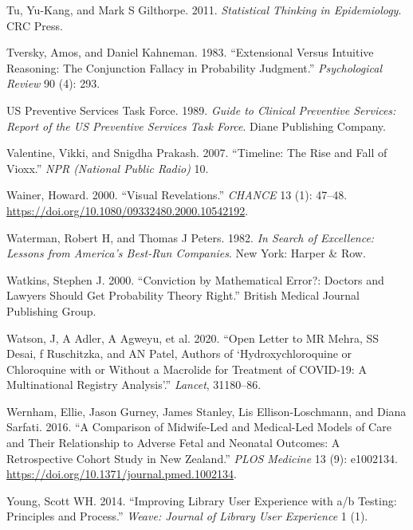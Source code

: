 \documentclass[
  10ptls,
  b5paper]{book}
\newlength{\cslhangindent}
\newlength{\cslentryspacingunit} %
\newenvironment{CSLReferences}[2] %
 {%
  \setlength{\parindent}{0pt}
  \ifodd #1
  \let\oldpar\par
  \def\par{\hangindent=\cslhangindent\oldpar}
  \fi
  \setlength{\parskip}{#2\cslentryspacingunit}
 }%
 {}
\begin{document}
\begin{CSLReferences}{1}{0}
\leavevmode{}%
Tu, Yu-Kang, and Mark S Gilthorpe. 2011. \emph{Statistical Thinking in Epidemiology}. CRC Press.

\leavevmode{}%
Tversky, Amos, and Daniel Kahneman. 1983. {``Extensional Versus Intuitive Reasoning: The Conjunction Fallacy in Probability Judgment.''} \emph{Psychological Review} 90 (4): 293.

\leavevmode{}%
US Preventive Services Task Force. 1989. \emph{Guide to Clinical Preventive Services: Report of the US Preventive Services Task Force}. Diane Publishing Company.

\leavevmode{}%
Valentine, Vikki, and Snigdha Prakash. 2007. {``Timeline: The Rise and Fall of Vioxx.''} \emph{NPR (National Public Radio)} 10.

\leavevmode{}%
Wainer, Howard. 2000. {``Visual Revelations.''} \emph{CHANCE} 13 (1): 47--48. \url{https://doi.org/10.1080/09332480.2000.10542192}.

\leavevmode{}%
Waterman, Robert H, and Thomas J Peters. 1982. \emph{In Search of Excellence: Lessons from America's Best-Run Companies}. New York: Harper \& Row.

\leavevmode{}%
Watkins, Stephen J. 2000. {``Conviction by Mathematical Error?: Doctors and Lawyers Should Get Probability Theory Right.''} British Medical Journal Publishing Group.

\leavevmode{}%
Watson, J, A Adler, A Agweyu, et al. 2020. {``Open Letter to MR Mehra, SS Desai, f Ruschitzka, and AN Patel, Authors of {`Hydroxychloroquine or Chloroquine with or Without a Macrolide for Treatment of COVID-19: A Multinational Registry Analysis'}.''} \emph{Lancet}, 31180--86.

\leavevmode{}%
Wernham, Ellie, Jason Gurney, James Stanley, Lis Ellison-Loschmann, and Diana Sarfati. 2016. {``A Comparison of Midwife-Led and Medical-Led Models of Care and Their Relationship to Adverse Fetal and Neonatal Outcomes: A Retrospective Cohort Study in New Zealand.''} \emph{PLOS Medicine} 13 (9): e1002134. \url{https://doi.org/10.1371/journal.pmed.1002134}.

\leavevmode{}%
Young, Scott WH. 2014. {``Improving Library User Experience with a/b Testing: Principles and Process.''} \emph{Weave: Journal of Library User Experience} 1 (1).

\end{CSLReferences}
\end{document}
